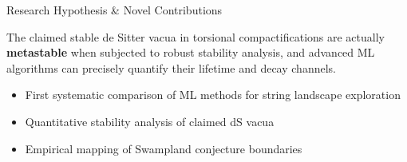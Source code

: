 
\begin{frame}{Research Hypothesis \& Novel Contributions}
\begin{tcolorbox}[
    enhanced,
    colback=black!85,
    colframe=Magenta,  %
    arc=3mm,
    boxrule=1.5pt,
    title={\color{Yellow!80!white}Hypothesis}
]
\color{White}
The claimed stable de Sitter vacua in torsional compactifications are actually \textbf{metastable} when subjected to robust stability analysis, and advanced ML algorithms can precisely quantify their lifetime and decay channels.
\end{tcolorbox}

\vspace{0.5cm}

\begin{tcolorbox}[
    enhanced,
    colback=black!85,
    colframe=LimeGreen,  %
    arc=3mm,
    boxrule=1.5pt,
    title={\color{PineGreen!80!Black}Novel Contributions}
]
\begin{itemize}
    \item First systematic comparison of ML methods for string landscape exploration
    \item Quantitative stability analysis of claimed dS vacua
    \item Empirical mapping of Swampland conjecture boundaries
\end{itemize}
\end{tcolorbox}
\end{frame}


